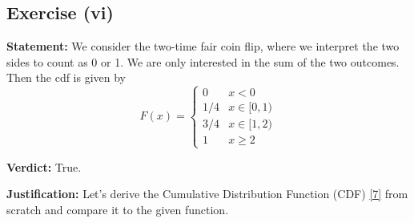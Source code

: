 \documentclass[11pt,a4paper]{article}
\begin{document}
\subsection*{Exercise (vi)}
\textbf{Statement:} We consider the two-time fair coin flip, where we interpret the two sides to count as 0 or 1. We are only interested in the sum of the two outcomes. Then the cdf is given by
\[
    F(x) = \begin{cases}
      0 & x < 0 \\
      1/4 & x \in [0, 1) \\
      3/4 & x \in [1, 2) \\
      1 & x \ge 2
   \end{cases}
\]

\vspace{1em}

\textbf{Verdict:} True.

\textbf{Justification:}
Let's derive the Cumulative Distribution Function (CDF) \hyperlink{note7}{[7]} from scratch and compare it to the given function.
\end{document}
